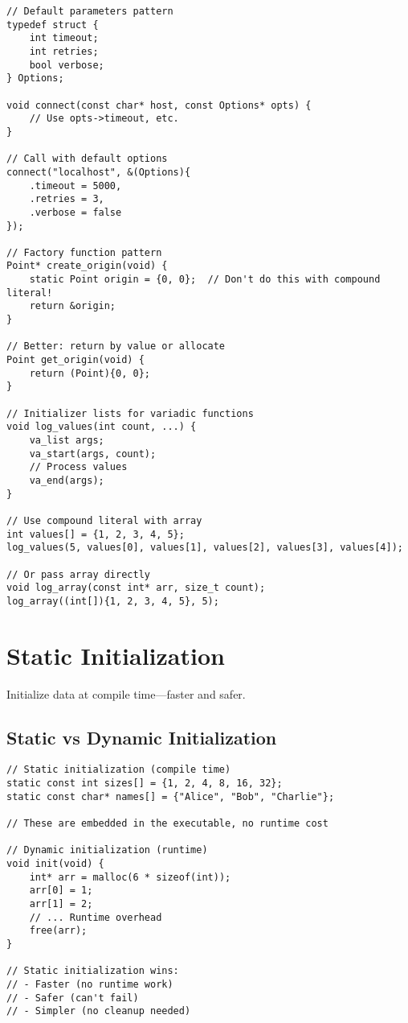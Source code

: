 \begin{lstlisting}
// Default parameters pattern
typedef struct {
    int timeout;
    int retries;
    bool verbose;
} Options;

void connect(const char* host, const Options* opts) {
    // Use opts->timeout, etc.
}

// Call with default options
connect("localhost", &(Options){
    .timeout = 5000,
    .retries = 3,
    .verbose = false
});

// Factory function pattern
Point* create_origin(void) {
    static Point origin = {0, 0};  // Don't do this with compound literal!
    return &origin;
}

// Better: return by value or allocate
Point get_origin(void) {
    return (Point){0, 0};
}

// Initializer lists for variadic functions
void log_values(int count, ...) {
    va_list args;
    va_start(args, count);
    // Process values
    va_end(args);
}

// Use compound literal with array
int values[] = {1, 2, 3, 4, 5};
log_values(5, values[0], values[1], values[2], values[3], values[4]);

// Or pass array directly
void log_array(const int* arr, size_t count);
log_array((int[]){1, 2, 3, 4, 5}, 5);
\end{lstlisting}

\section{Static Initialization}

Initialize data at compile time—faster and safer.

\subsection{Static vs Dynamic Initialization}

\begin{lstlisting}
// Static initialization (compile time)
static const int sizes[] = {1, 2, 4, 8, 16, 32};
static const char* names[] = {"Alice", "Bob", "Charlie"};

// These are embedded in the executable, no runtime cost

// Dynamic initialization (runtime)
void init(void) {
    int* arr = malloc(6 * sizeof(int));
    arr[0] = 1;
    arr[1] = 2;
    // ... Runtime overhead
    free(arr);
}

// Static initialization wins:
// - Faster (no runtime work)
// - Safer (can't fail)
// - Simpler (no cleanup needed)
\end{lstlisting}

